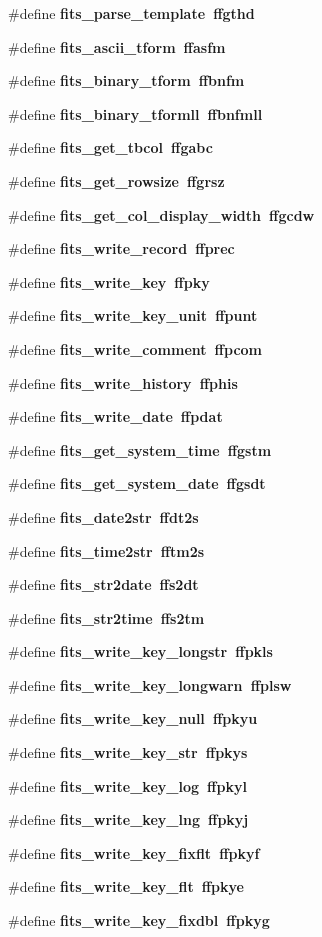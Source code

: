 \begin{CompactItemize}
\#define \bf{fits\_\-parse\_\-template}~ffgthd
\item 
\#define \bf{fits\_\-ascii\_\-tform}~ffasfm
\item 
\#define \bf{fits\_\-binary\_\-tform}~ffbnfm
\item 
\#define \bf{fits\_\-binary\_\-tformll}~ffbnfmll
\item 
\#define \bf{fits\_\-get\_\-tbcol}~ffgabc
\item 
\#define \bf{fits\_\-get\_\-rowsize}~ffgrsz
\item 
\#define \bf{fits\_\-get\_\-col\_\-display\_\-width}~ffgcdw
\item 
\#define \bf{fits\_\-write\_\-record}~ffprec
\item 
\#define \bf{fits\_\-write\_\-key}~ffpky
\item 
\#define \bf{fits\_\-write\_\-key\_\-unit}~ffpunt
\item 
\#define \bf{fits\_\-write\_\-comment}~ffpcom
\item 
\#define \bf{fits\_\-write\_\-history}~ffphis
\item 
\#define \bf{fits\_\-write\_\-date}~ffpdat
\item 
\#define \bf{fits\_\-get\_\-system\_\-time}~ffgstm
\item 
\#define \bf{fits\_\-get\_\-system\_\-date}~ffgsdt
\item 
\#define \bf{fits\_\-date2str}~ffdt2s
\item 
\#define \bf{fits\_\-time2str}~fftm2s
\item 
\#define \bf{fits\_\-str2date}~ffs2dt
\item 
\#define \bf{fits\_\-str2time}~ffs2tm
\item 
\#define \bf{fits\_\-write\_\-key\_\-longstr}~ffpkls
\item 
\#define \bf{fits\_\-write\_\-key\_\-longwarn}~ffplsw
\item 
\#define \bf{fits\_\-write\_\-key\_\-null}~ffpkyu
\item 
\#define \bf{fits\_\-write\_\-key\_\-str}~ffpkys
\item 
\#define \bf{fits\_\-write\_\-key\_\-log}~ffpkyl
\item 
\#define \bf{fits\_\-write\_\-key\_\-lng}~ffpkyj
\item 
\#define \bf{fits\_\-write\_\-key\_\-fixflt}~ffpkyf
\item 
\#define \bf{fits\_\-write\_\-key\_\-flt}~ffpkye
\item 
\#define \bf{fits\_\-write\_\-key\_\-fixdbl}~ffpkyg
\item 

\end{CompactItemize}
